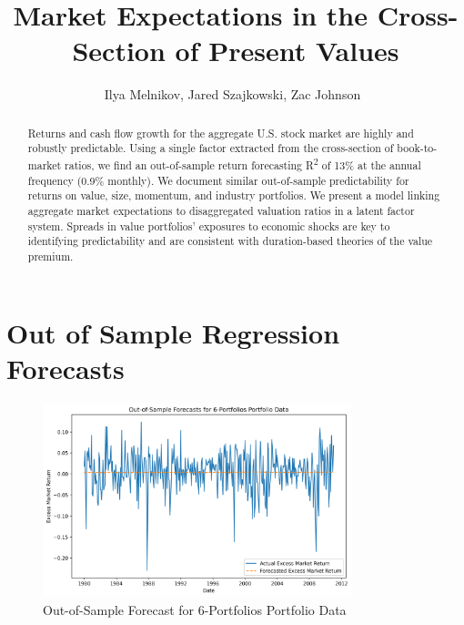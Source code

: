 \documentclass[12pt]{article}
\begin{document}
\title{
Market Expectations in the Cross-Section of Present Values
}

\author{
Ilya Melnikov, Jared Szajkowski, Zac Johnson\
}
\begin{titlepage}
\maketitle

\doublespacing
\begin{abstract}
    Returns and cash flow growth for the aggregate U.S. stock market are highly and robustly predictable. 
    Using a single factor extracted from the cross-section of book-to-market ratios, 
    we find an out-of-sample return forecasting R\textsuperscript{2} of 13\% at the annual frequency (0.9\% monthly). 
    We document similar out-of-sample predictability for returns on value, size, momentum, and industry portfolios. 
    We present a model linking aggregate market expectations to disaggregated valuation ratios in a latent factor system. 
    Spreads in value portfolios’ exposures to economic shocks are key to identifying predictability and are consistent 
    with duration-based theories of the value premium.
\end{abstract}

\end{titlepage}


\doublespacing
\section{Out of Sample Regression Forecasts}

\begin{figure}[h]
    \centering
    \includegraphics[width=0.8\textwidth]{plots/Out_of_Sample_Forecasts_for_6_Portfolios_Portfolio_Data.png}
    \caption{Out-of-Sample Forecast for 6-Portfolios Portfolio Data}
    \label{fig:forecast_chart}
\end{figure}
\end{document}

